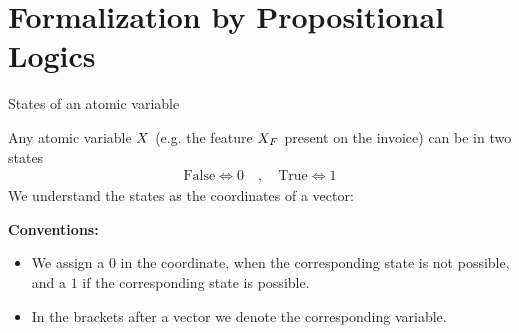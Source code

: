 \documentclass{beamer}
\begin{document}
    \section{Formalization by Propositional Logics}

    \begin{frame}{States of an atomic variable}

        Any atomic variable $X$ (e.g. the feature $X_{F}$ present on the invoice) can be in two states
        \begin{align*}
            \mathrm{False} \Leftrightarrow 0 \quad,\quad \mathrm{True} \Leftrightarrow 1
        \end{align*}
        We understand the states as the coordinates of a vector:
        \begin{center}
        \end{center}

        \textbf{Conventions:}
        \begin{itemize}
            \item We assign a $0$ in the coordinate, when the corresponding state is not possible, and a $1$ if the corresponding state is possible.
            \item In the brackets after a vector we denote the corresponding variable.
        \end{itemize}


    \end{frame}
\end{document}
